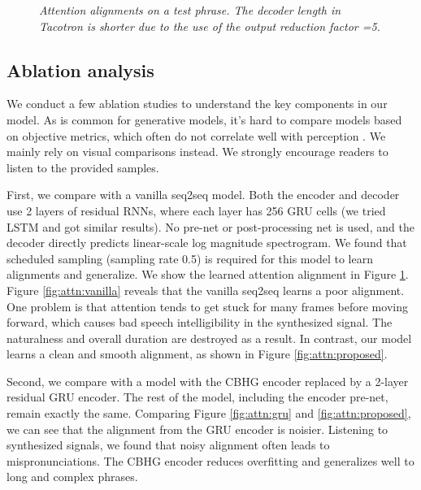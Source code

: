 \documentclass{article} \usepackage{iclr2017_conference,times}
\begin{document}
\begin{figure}[t]
\centering
{}
\caption{{\it Attention alignments on a test phrase. The decoder length in Tacotron is shorter due to the use of the output reduction factor =5. }}
\label{fig:attn}
\end{figure}


\subsection{Ablation analysis}
We conduct a few ablation studies to understand the key components in our model. As is common for generative models, it's hard to compare models based on objective metrics, which often do not correlate well with perception \citep{theis2015note}. We mainly rely on visual comparisons instead. We strongly encourage readers to listen to the provided samples.

First, we compare with a vanilla seq2seq model. Both the encoder and decoder use 2 layers of residual RNNs, where each layer has 256 GRU cells (we tried LSTM and got similar results). No pre-net or post-processing net is used, and the decoder directly predicts linear-scale log magnitude spectrogram. We found that scheduled sampling (sampling rate 0.5) is required for this model to learn alignments and generalize. We show the learned attention alignment in Figure \ref{fig:attn}. Figure \ref{fig:attn:vanilla} reveals that the vanilla seq2seq learns a poor alignment. One problem is that attention tends to get stuck for many frames before moving forward, which causes bad speech intelligibility in the synthesized signal. The naturalness and overall duration are destroyed as a result. In contrast, our model learns a clean and smooth alignment, as shown in Figure \ref{fig:attn:proposed}.

Second, we compare with a model with the CBHG encoder replaced by a 2-layer residual GRU encoder. The rest of the model, including the encoder pre-net, remain exactly the same. Comparing Figure \ref{fig:attn:gru} and \ref{fig:attn:proposed}, we can see that the alignment from the GRU encoder is noisier. Listening to synthesized signals, we found that noisy alignment often leads to mispronunciations. The CBHG encoder reduces overfitting and generalizes well to long and complex phrases.
\end{document}
